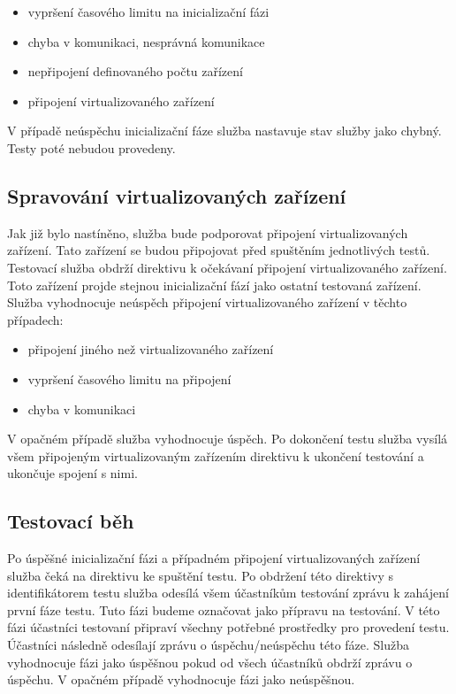 \begin{itemize}
    \item vypršení časového limitu na inicializační fázi
    \item chyba v komunikaci, nesprávná komunikace
    \item nepřipojení definovaného počtu zařízení
    \item připojení virtualizovaného zařízení
\end{itemize}

V případě neúspěchu inicializační fáze služba nastavuje stav služby jako chybný. Testy poté nebudou provedeny.

\subsection{Spravování virtualizovaných zařízení}
Jak již bylo nastíněno, služba bude podporovat připojení virtualizovaných zařízení. Tato zařízení se budou připojovat před spuštěním jednotlivých testů. Testovací služba obdrží direktivu k očekávaní připojení virtualizovaného zařízení. Toto zařízení projde stejnou inicializační fází jako ostatní testovaná zařízení. Služba vyhodnocuje neúspěch připojení virtualizovaného zařízení v těchto případech:

\begin{itemize}
    \item připojení jiného než virtualizovaného zařízení
    \item vypršení časového limitu na připojení
    \item chyba v komunikaci
\end{itemize}

V opačném případě služba vyhodnocuje úspěch. Po dokončení testu služba vysílá všem připojeným virtualizovaným zařízením direktivu k ukončení testování a ukončuje spojení s nimi.

\subsection{Testovací běh}\label{test_run}
Po úspěšné inicializační fázi a případném připojení virtualizovaných zařízení služba čeká na direktivu ke spuštění testu. Po obdržení této direktivy s identifikátorem testu služba odesílá všem účastníkům testování zprávu k zahájení první fáze testu. Tuto fázi budeme označovat jako přípravu na testování. V této fázi účastníci testovaní připraví všechny potřebné prostředky pro provedení testu. Účastníci následně odesílají zprávu o úspěchu/neúspěchu této fáze. Služba vyhodnocuje fázi jako úspěšnou pokud od všech účastníků obdrží zprávu o úspěchu. V opačném případě vyhodnocuje fázi jako neúspěšnou.

